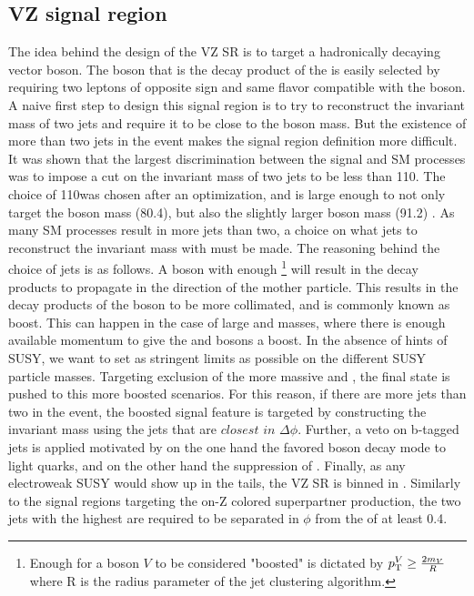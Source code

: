 \subsection*{VZ signal region}
\noindent
\justify
The idea behind the design of the VZ SR is to target a hadronically decaying vector boson.
The \PZ boson that is the decay product of the \PSGczDt is easily selected by requiring two leptons of opposite sign and same flavor compatible with the \PZ boson.
A naive first step to design this signal region is to try to reconstruct the invariant mass of two jets and require it to be close to the \PW boson mass.
But the existence of more than two jets in the event makes the signal region definition more difficult.  
It was shown that the largest discrimination between the signal and SM processes was to impose a cut on the invariant mass of two jets to be less than 110\GeV.
The choice of 110\GeV was chosen after an optimization, and is large enough to not only target the \PW boson mass (80.4\GeV), but also the slightly larger \PZ boson mass (91.2\GeV) \cite{PhysRevD.98.030001}. 
As many SM processes result in more jets than two, a choice on what jets to reconstruct the invariant mass with must be made.
The reasoning behind the choice of jets is as follows. 
A \PW boson with enough \pt\footnote{Enough \pt for a boson $V$ to be considered "boosted" is dictated by $p_{\mathrm{T}}^{V}\geq\frac{2m_{V}}{R}$ where R is the radius parameter of the jet clustering algorithm.} will result in the decay products to propagate in the direction of the mother particle.  
This results in the decay products of the \PW boson to be more collimated, and is commonly known as boost.
This can happen in the case of large \PSGczDt and \firstcharg masses, where there is enough available momentum to give the \PZ and \PW bosons a boost.
In the absence of hints of SUSY, we want to set as stringent limits as possible on the different SUSY particle masses. 
Targeting exclusion of the more massive \PSGczDt and \firstcharg, the final state is pushed to this more boosted scenarios.
For this reason, if there are more jets than two in the event, the boosted signal feature is targeted by constructing the invariant mass using the jets that are $closest$ $in$ $\Delta\phi$.
\newpara
\noindent\justify
Further, a veto on b-tagged jets is applied motivated by on the one hand the favored \PW boson decay mode to light quarks, and on the other hand the suppression of \ttbar. 
Finally, as any electroweak SUSY would show up in the \ptmiss tails, the VZ SR is binned in \ptmiss. 
Similarly to the signal regions targeting the on-Z colored superpartner production, the two jets with the highest \pt are required to be separated in $\phi$ from the \ptmiss of at least 0.4.
